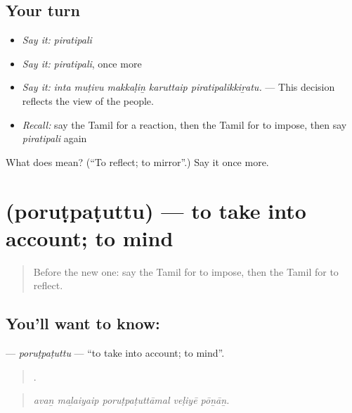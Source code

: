 \subsection*{Your turn}
\begin{itemize}
\raggedright
  \item \emph{Say it:} \emph{piratipali}
  \item \emph{Say it:} \emph{piratipali}, once more
  \item \emph{Say it:} \emph{inta muṭivu makkaḷiṉ karuttaip piratipalikkiṟatu.} — This decision reflects the view of the people.
  \item \emph{Recall:} say the Tamil for a reaction, then the Tamil for to impose, then say \emph{piratipali} again
\end{itemize}

\begin{tcolorbox}[breakable,colback=teal!4,colframe=teal!35!black,title={Before you move on}]
What does  mean? (\textquotedblleft{}To reflect; to mirror\textquotedblright{}.) Say it once more.
\end{tcolorbox}
\section[\texorpdfstring{\ta{பொருட்படுத்து} (poruṭpaṭuttu)}{பொருட்படுத்து (poruṭpaṭuttu)}]{ (poruṭpaṭuttu) — to take into account; to mind}

\label{lesson:TA-C396-porutpatuttu}



\begin{quote}
Before the new one: say the Tamil for to impose, then the Tamil for to reflect.
\end{quote}

\subsection*{You'll want to know: }
\textbf{} — \emph{poruṭpaṭuttu} — \textquotedblleft{}to take into account; to mind\textquotedblright{}.

\begin{quote}
    .
\end{quote}

\begin{quote}
\emph{avaṉ maḻaiyaip poruṭpaṭuttāmal veḷiyē pōṉāṉ.}
\end{quote}

